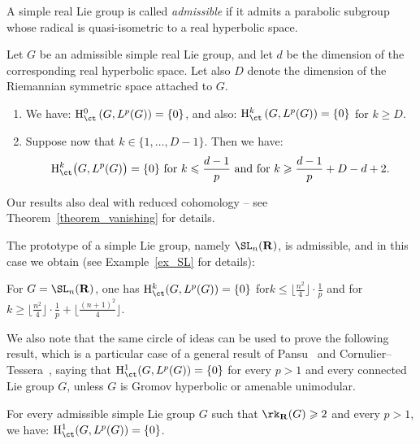 \begin{defi}\label{intro-def}
A simple real Lie group is called \emph{admissible} if it admits a parabolic subgroup whose radical is quasi-isometric to a real hyperbolic space.
\end{defi}

\begin{theo}\label{intro-thm2}
Let $G$ be an admissible simple real Lie group, and let $d$ be the dimension of the corresponding real hyperbolic space. Let also $D$ denote the dimension of the Riemannian symmetric space attached to $G$.
\begin{enumerate}
\item We have: ${\rm H}^0 _{\ct}\left(G, L^p(G) \right) = \{0\}$, and also: ${\rm H}^k _{\ct}\left(G, L^p(G) \right) = \{0\}$ for $k \geqslant D$.
\item Suppose now that $k \in \{1,\dots,D-1\}$. Then we have:
\[
{\rm H}^k _{\ct}\bigl(G, L^p(G) \bigr) = \{0\} \,\, \text{for} \,\, k \leqslant \frac{d-1}{p} \,\, \text{and for} \,\, k \geqslant \frac{d-1}{p} + D-d+2.
\]
\end{enumerate}
\end{theo}

Our results also deal with reduced cohomology -- see Theorem~\ref{theorem_vanishing} for details.


The prototype of a simple Lie group, namely $\SL_n({\bf R})$, is admissible, and in this case we obtain (see Example~\ref{ex_SL} for details):

\begin{coro}\label{intro_cor1}
For $G = \SL_n({\bf R})$, one has ${\rm H}^k _{\ct} (G, L^p(G)) = \{0\}$ for\linebreak $k \leqslant \lfloor \frac{n^2}{4}\rfloor \cdot\frac{1}{p}$ and for $k \geqslant \lfloor \frac{n^2}{4}\rfloor \cdot\frac{1}{p} + \lfloor \frac{(n+1)^2}{4}\rfloor $.
\end{coro}

We also note that the same circle of ideas can be used to prove the following result, which is a particular case of a general result of Pansu~\cite{P2} and Cornulier--Tessera~\cite{CT}, saying that ${\rm H}^1_{\ct} (G, L^p(G)) = \{0\}$ for every $p>1$ and every connected Lie group $G$, unless $G$ is Gromov hyperbolic or amenable unimodular.


\begin{coro}\label{intro_cor2}
For every admissible simple Lie group $G$ such that $\rk_{\bf R} (G) \linebreak\geqslant 2$ and every $p >1$, we have: ${\rm H}^1 _{\ct}(G, L^p(G)) = \{0\}$.
\end{coro}


